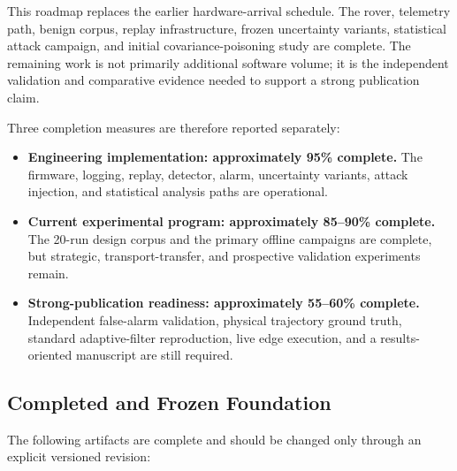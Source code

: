 \documentclass[11pt,a4paper]{article}
\begin{document}
This roadmap replaces the earlier hardware-arrival schedule. The rover,
telemetry path, benign corpus, replay infrastructure, frozen uncertainty
variants, statistical attack campaign, and initial covariance-poisoning study
are complete. The remaining work is not primarily additional software volume;
it is the independent validation and comparative evidence needed to support a
strong publication claim.

Three completion measures are therefore reported separately:

\begin{itemize}
    \item \textbf{Engineering implementation: approximately 95\% complete.}
    The firmware, logging, replay, detector, alarm, uncertainty variants,
    attack injection, and statistical analysis paths are operational.

    \item \textbf{Current experimental program: approximately 85--90\%
    complete.} The 20-run design corpus and the primary offline campaigns are
    complete, but strategic, transport-transfer, and prospective validation
    experiments remain.

    \item \textbf{Strong-publication readiness: approximately 55--60\%
    complete.} Independent false-alarm validation, physical trajectory ground
    truth, standard adaptive-filter reproduction, live edge execution, and a
    results-oriented manuscript are still required.
\end{itemize}

\subsection{Completed and Frozen Foundation}

The following artifacts are complete and should be changed only through an
explicit versioned revision:
\end{document}
